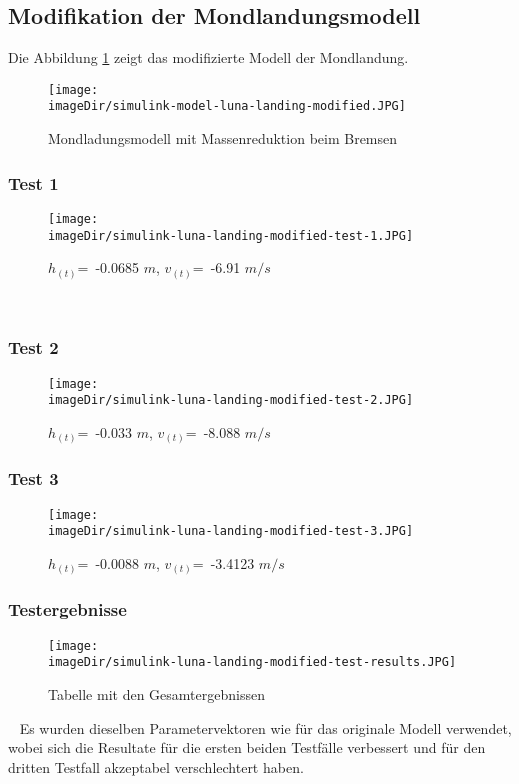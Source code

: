 \newpage

\subsection{Modifikation der Mondlandungsmodell}
\label{sec:sub-simulink-modified-model-luna-landing}
Die Abbildung \ref{fig:simulink-luna-landing-modified} zeigt das modifizierte Modell der Mondlandung.
\begin{figure}[h]
	\centering
	\texttt{[image: \\imageDir/simulink-model-luna-landing-modified.JPG]}
	\caption{Mondladungsmodell mit Massenreduktion beim Bremsen}
	\label{fig:simulink-luna-landing-modified}
\end{figure}

\subsubsection{Test 1}
\begin{figure}[h]
	\centering
	\texttt{[image: \\imageDir/simulink-luna-landing-modified-test-1.JPG]}
	\caption{$h_{(t)}$=~-0.0685 $m$, $v_{(t)}$=~-6.91 $m/s$}
	\label{fig:simulink-luna-landing-modified-test-1}
\end{figure}
\ \newpage

\subsubsection{Test 2}
\begin{figure}[h]
	\centering
	\texttt{[image: \\imageDir/simulink-luna-landing-modified-test-2.JPG]}
	\caption{$h_{(t)}$=~-0.033 $m$, $v_{(t)}$=~-8.088 $m/s$}
	\label{fig:simulink-luna-landing-modified-test-2}
\end{figure}

\subsubsection{Test 3}
\begin{figure}[h]
	\centering
	\texttt{[image: \\imageDir/simulink-luna-landing-modified-test-3.JPG]}
	\caption{$h_{(t)}$=~-0.0088 $m$, $v_{(t)}$=~-3.4123 $m/s$}
	\label{fig:simulink-luna-landing-modified-test-3}
\end{figure}
\newpage

\subsubsection{Testergebnisse}
\label{sec:simulink-luna-landing-modified-test-results}
\begin{figure}[h]
	\centering
	\texttt{[image: \\imageDir/simulink-luna-landing-modified-test-results.JPG]}
	\caption{Tabelle mit den Gesamtergebnissen}
	\label{fig:simulink-luna-landing-modified-test-result}
\end{figure}
\ \newline
Es wurden dieselben Parametervektoren wie für das originale Modell verwendet, wobei sich die Resultate für die ersten beiden Testfälle verbessert und für den dritten Testfall akzeptabel verschlechtert haben.
\newpage